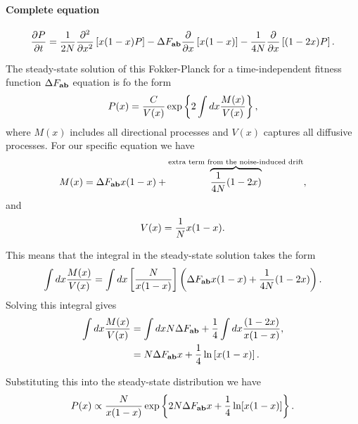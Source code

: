 \paragraph{Complete equation}
\begin{equation}
  {\partial P \over \partial t} = {1 \over 2N}
  {\partial^2 \over \partial x^2} \left[ x (1 - x) P \right] -
  \Delta F_{\mathbf{ab}} {\partial \over \partial x} \left[ x (1 - x)  \right] -
  {1 \over 4N} {\partial \over \partial x} \left[ (1 - 2x) P \right].
\end{equation}

The steady-state solution of this Fokker-Planck for a time-independent fitness
function $\Delta F_{\mathbf{ab}}$ equation is fo the form 
\begin{equation}
  P(x) = {C \over V(x)} \exp \left\{ 2 \int dx {M(x) \over V(x)} \right\},
\end{equation}
where $M(x)$ includes all directional processes and $V(x)$ captures all
diffusive processes. For our specific equation we have
\begin{equation}
  M(x) = \Delta F_{\mathbf{ab}} x (1 - x) + \overbrace{{1 \over 4N} (1 - 2x)}^
  {\text{extra term from the noise-induced drift}},
\end{equation}
and
\begin{equation}
  V(x) = {1 \over N} x (1 - x).
\end{equation}

This means that the integral in the steady-state solution takes the form
\begin{equation}
  \int dx {M(x) \over V(x)} = \int dx \left[ {N \over x (1 - x)} \right]
  \left( \Delta F_{\mathbf{ab}} x (1 - x) + {1 \over 4N} (1 - 2x) \right).
\end{equation}
Solving this integral gives
\begin{align}
  \int dx {M(x) \over V(x)} &= \int dx N \Delta F_{\mathbf{ab}} +
  {1 \over 4} \int dx {(1 - 2x) \over x (1 - x)}, \\
  &= N \Delta F_{\mathbf{ab}} x + {1 \over 4} \ln \left[ x ( 1 - x) \right].
\end{align}

Substituting this into the steady-state distribution we have
\begin{equation}
  P(x) \propto {N \over x (1 - x)} \exp \left\{ 2N \Delta F_{\mathbf{ab}} x +
  {1 \over 4} \ln[x (1 - x)] \right\}.
\end{equation}


